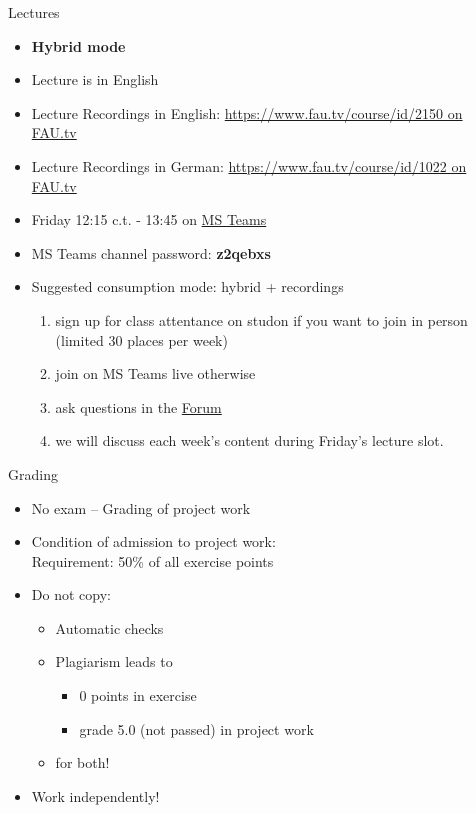 \begin{frame}[c]{Lectures}
	\begin{itemize}
		\setlength\itemsep{0.4cm}
		\item \textbf{Hybrid mode}
		\item Lecture is in English
		\item Lecture Recordings in English: \href{https://www.fau.tv/course/id/2150}{https://www.fau.tv/course/id/2150 on FAU.tv}
		\item Lecture Recordings in German: \href{https://www.fau.tv/course/id/1022}{https://www.fau.tv/course/id/1022 on FAU.tv}
		\item Friday 12:15 c.t. - 13:45 on \href{https://teams.microsoft.com/l/team/19\%3adRCxup9jUsjM31xr9T4jdAFDB-ImEk_lU5Fy05ijYx81\%40thread.tacv2/conversations?groupId=6b2df36b-cec0-46b3-83d2-b4e6d1c6ac30\&tenantId=b2efcef3-8496-40b8-9de8-f135982f3461}{MS Teams}
		\item MS Teams channel password: \textbf{z2qebxs}
		\item Suggested consumption mode: hybrid + recordings 
		\begin{enumerate}
			\item sign up for class attentance on studon if you want to join in person (limited 30 places per week)
                        \item join on MS Teams live otherwise
			\item ask questions in the \href{https://www.studon.fau.de/studon/goto.php?target=frm_4685856}{Forum}
			\item we will discuss each week's content during Friday's lecture slot.   
		\end{enumerate}
	\end{itemize}
\end{frame}

\begin{frame}[c]{Grading}
	\begin{itemize}
		\setlength\itemsep{0.4cm}
		\item No exam -- Grading of project work
		\item Condition of admission to project work:\\
		      Requirement: 50\% of all exercise points
		\item Do not copy:
		      \begin{itemize}
			      \item Automatic checks
			      \item Plagiarism leads to
			            \begin{itemize}
				            \item 0 points in exercise
				            \item grade 5.0 (not passed) in project work
			            \end{itemize}
			      \item for both!
		      \end{itemize}
		\item Work independently!
	\end{itemize}
\end{frame}

